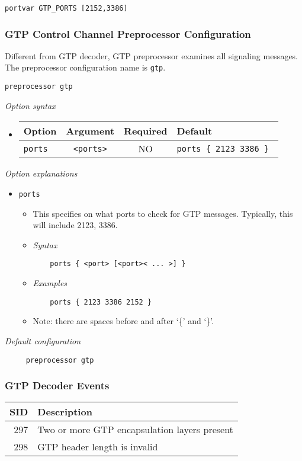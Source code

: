 \documentclass[english]{report}
\begin{document}
\begin{verbatim}
portvar GTP_PORTS [2152,3386]
\end{verbatim}

\subsubsection{GTP Control Channel Preprocessor Configuration}

Different from GTP decoder, GTP preprocessor examines all signaling messages.
The preprocessor configuration name is \texttt{gtp}.
\begin{verbatim}
preprocessor gtp
\end{verbatim}
\textit{Option syntax}
\begin{itemize}
\item[]
\begin{tabular}{|l|c|c|p{6cm}|}
\hline
Option & Argument & Required & Default\\
\hline
\hline
\texttt{ports} & \texttt{<ports>} & NO & \texttt{ports \{ 2123 3386 \} }\\
\hline
\end{tabular}
\end{itemize}
\normalsize
\textit{Option explanations}
\begin{itemize}
\item[] \texttt{ports}
\begin{itemize}
\item[]  This specifies on what ports to check for GTP messages. Typically, 
     this will include 2123, 3386.
\item[] \textit{Syntax}
\begin{verbatim}
    ports { <port> [<port>< ... >] }
\end{verbatim}
\item[] \textit{Examples}
\begin{verbatim}
    ports { 2123 3386 2152 }
\end{verbatim}
\item[] Note: there are spaces before and after `\{' and `\}'.
\end{itemize}
\end{itemize}
\normalsize

\textit{Default configuration}
\footnotesize
\begin{verbatim}
     preprocessor gtp
\end{verbatim}
\normalsize
\subsubsection{GTP Decoder Events}
\begin{longtable}{|r|p{13.5cm}|}
\hline
SID & Description\\
\hline
 297 &  Two or more GTP encapsulation layers present \\
\hline
 298 &  GTP header length is invalid  \\
\hline
\end{longtable}
\end{document}
